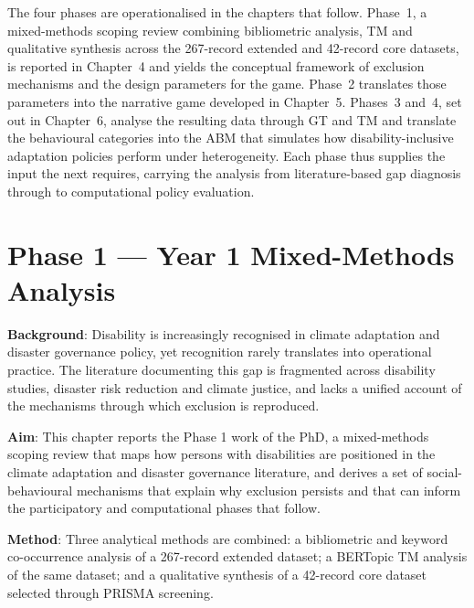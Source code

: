\documentclass[12pt,a4paper]{report}
\begin{document}
The four phases are operationalised in the chapters that follow. Phase~1, a mixed-methods scoping review combining bibliometric analysis, TM and qualitative synthesis across the 267-record extended and 42-record core datasets, is reported in Chapter~4 and yields the conceptual framework of exclusion mechanisms and the design parameters for the game. Phase~2 translates those parameters into the narrative game developed in Chapter~5. Phases~3 and~4, set out in Chapter~6, analyse the resulting data through GT and TM and translate the behavioural categories into the ABM that simulates how disability-inclusive adaptation policies perform under heterogeneity. Each phase thus supplies the input the next requires, carrying the analysis from literature-based gap diagnosis through to computational policy evaluation.






\clearpage

\chapter{Phase 1 — Year 1 Mixed-Methods Analysis}
\vspace*{-1cm}

\noindent\textbf{Background}: Disability is increasingly recognised in climate adaptation and disaster governance policy, yet recognition rarely translates into operational practice. The literature documenting this gap is fragmented across disability studies, disaster risk reduction and climate justice, and lacks a unified account of the mechanisms through which exclusion is reproduced.

\noindent\textbf{Aim}: This chapter reports the Phase 1 work of the PhD, a mixed-methods scoping review that maps how persons with disabilities are positioned in the climate adaptation and disaster governance literature, and derives a set of social-behavioural mechanisms that explain why exclusion persists and that can inform the participatory and computational phases that follow.

\noindent\textbf{Method}: Three analytical methods are combined: a bibliometric and keyword co-occurrence analysis of a 267-record extended dataset; a BERTopic TM analysis of the same dataset; and a qualitative synthesis of a 42-record core dataset selected through PRISMA screening.
\end{document}
